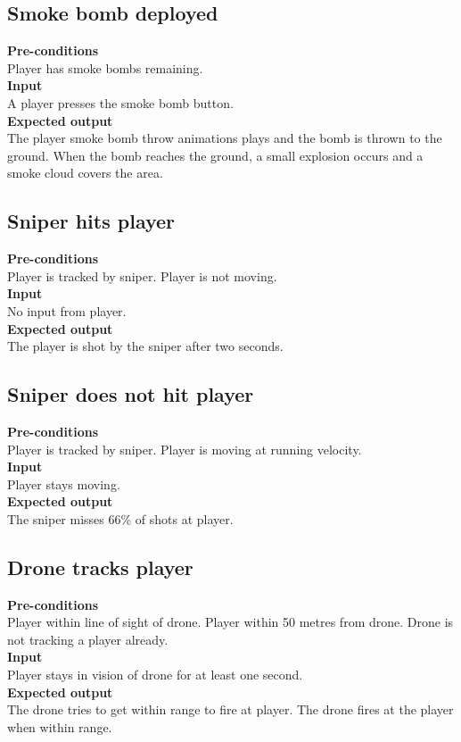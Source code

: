 \documentclass[a4paper,10pt]{article}
\begin{document}
    \subsection{Smoke bomb deployed}
    \textbf{Pre-conditions}\\
    Player has smoke bombs remaining.
    \smallskip\\\textbf{Input}\\
    A player presses the smoke bomb button.
    \smallskip\\\textbf{Expected output}\\
    The player smoke bomb throw animations plays and the bomb is thrown to the ground. When the bomb reaches the ground, a small explosion occurs and a smoke cloud covers the area.
    
    \subsection{Sniper hits player}
    \textbf{Pre-conditions}\\
    Player is tracked by sniper. Player is not moving.
    \smallskip\\\textbf{Input}\\
    No input from player.
    \smallskip\\\textbf{Expected output}\\
    The player is shot by the sniper after two seconds.
    
    \subsection{Sniper does not hit player}
    \textbf{Pre-conditions}\\
    Player is tracked by sniper. Player is moving at running velocity.
    \smallskip\\\textbf{Input}\\
    Player stays moving.
    \smallskip\\\textbf{Expected output}\\
    The sniper misses 66\% of shots at player.
    
    \subsection{Drone tracks player}
    \textbf{Pre-conditions}\\
    Player within line of sight of drone. Player within 50 metres from drone. Drone is not tracking a player already.
    \smallskip\\\textbf{Input}\\
    Player stays in vision of drone for at least one second.
    \smallskip\\\textbf{Expected output}\\
    The drone tries to get within range to fire at player. The drone fires at the player when within range.
        
\end{document}
